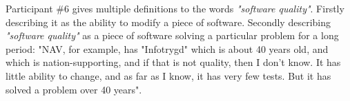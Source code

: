 Participant \#6 gives multiple definitions to the words \textit{"software quality"}. Firstly describing it as the ability to modify a piece of software. Secondly describing \textit{"software quality"} as a piece of software solving a particular problem for a long period: "NAV, for example, has "Infotrygd" which is about 40 years old, and which is nation-supporting, and if that is not quality, then I don't know. It has little ability to change, and as far as I know, it has very few tests. But it has solved a problem over 40 years".





